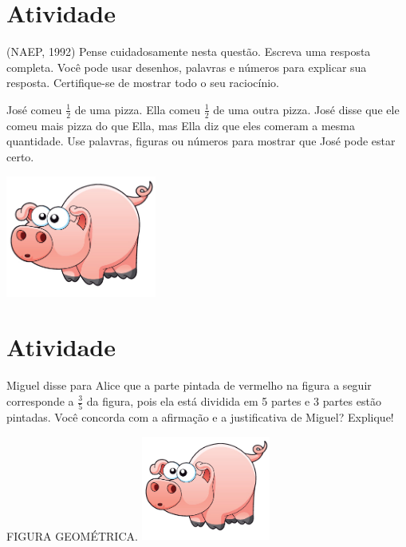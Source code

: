 \documentclass[a4,12pt]{book}
\begin{document}
\section{Atividade}







(NAEP, 1992) Pense cuidadosamente nesta questão. Escreva uma resposta completa. Você pode usar desenhos, palavras e números para explicar sua resposta. Certifique-se de mostrar todo o seu raciocínio.

José comeu $\frac{1}{2}$ de uma pizza. Ella comeu $\frac{1}{2}$ de uma outra pizza. José disse que ele comeu mais pizza do que Ella, mas Ella diz que eles comeram a mesma quantidade. Use palavras, figuras ou números para mostrar que José pode estar certo.





\includegraphics[width=\textwidth,height=4cm, keepaspectratio]{pig}
\section{Atividade}







Miguel disse para Alice que a parte pintada de vermelho na figura a seguir corresponde a $\frac{3}{5}$ da figura, pois ela está dividida em 5 partes e 3 partes estão pintadas. Você concorda com a afirmação e a justificativa de Miguel? Explique!
\begin{imagem*}[breakable]{}{}   FIGURA GEOMÉTRICA.
    \includegraphics[width=120pt, keepaspectratio]{pig}
\end{imagem*}
\end{document}
